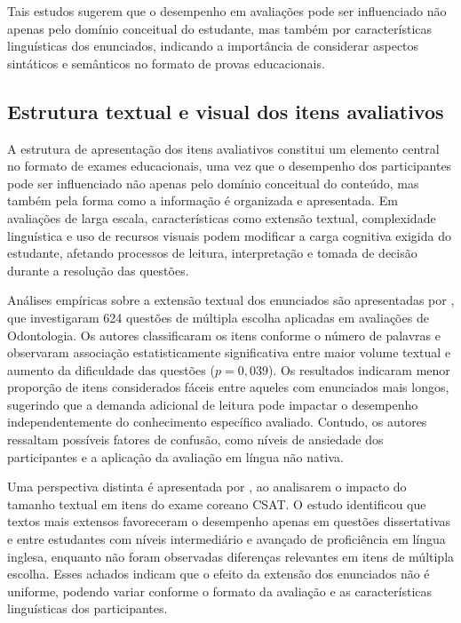 \documentclass[a4paper,10pt, twocolumn]{article}
\begin{document}
Tais estudos sugerem que o desempenho em avaliações pode ser influenciado não apenas pelo domínio conceitual do estudante, mas também por características linguísticas dos enunciados, indicando a importância de considerar aspectos sintáticos e semânticos no formato de provas educacionais.

\subsection{Estrutura textual e visual dos itens avaliativos}

A estrutura de apresentação dos itens avaliativos constitui um elemento central no formato de exames educacionais, uma vez que o desempenho dos participantes pode ser influenciado não apenas pelo domínio conceitual do conteúdo, mas também pela forma como a informação é organizada e apresentada. Em avaliações de larga escala, características como extensão textual, complexidade linguística e uso de recursos visuais podem modificar a carga cognitiva exigida do estudante, afetando processos de leitura, interpretação e tomada de decisão durante a resolução das questões.

Análises empíricas sobre a extensão textual dos enunciados são apresentadas por \textcite{Pullishery2020}, que investigaram 624 questões de múltipla escolha aplicadas em avaliações de Odontologia. Os autores classificaram os itens conforme o número de palavras e observaram associação estatisticamente significativa entre maior volume textual e aumento da dificuldade das questões ($p = 0{,}039$). Os resultados indicaram menor proporção de itens considerados fáceis entre aqueles com enunciados mais longos, sugerindo que a demanda adicional de leitura pode impactar o desempenho independentemente do conhecimento específico avaliado. Contudo, os autores ressaltam possíveis fatores de confusão, como níveis de ansiedade dos participantes e a aplicação da avaliação em língua não nativa.

Uma perspectiva distinta é apresentada por \textcite{2018}, ao analisarem o impacto do tamanho textual em itens do exame coreano CSAT. O estudo identificou que textos mais extensos favoreceram o desempenho apenas em questões dissertativas e entre estudantes com níveis intermediário e avançado de proficiência em língua inglesa, enquanto não foram observadas diferenças relevantes em itens de múltipla escolha. Esses achados indicam que o efeito da extensão dos enunciados não é uniforme, podendo variar conforme o formato da avaliação e as características linguísticas dos participantes.
\end{document}
